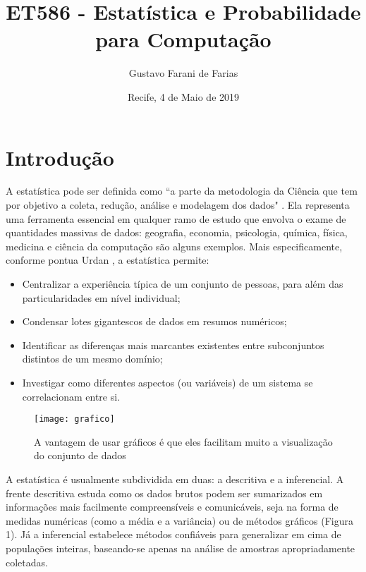 \documentclass[10pt]{article}
\title{ET586 - Estatística e Probabilidade para Computação}
\author{Gustavo Farani de Farias}
\date{Recife, 4 de Maio de 2019}
\begin{document}
\maketitle

\section{Introdução}
A estatística pode ser definida como ``a parte da metodologia da Ciência que tem por objetivo a coleta, redução, análise e modelagem dos dados" \cite{bussab}. Ela representa uma ferramenta essencial em qualquer ramo de estudo que envolva o exame de quantidades massivas de dados: geografia, economia, psicologia, química, física, medicina e ciência da computação são alguns exemplos. Mais especificamente, conforme pontua Urdan \cite{urdan}, a estatística permite:

\begin{itemize}
    \item Centralizar a experiência típica de um conjunto de pessoas, para além das particularidades em nível individual;
    \item Condensar lotes gigantescos de dados em resumos numéricos;
    \item Identificar as diferenças mais marcantes existentes entre subconjuntos distintos de um mesmo domínio;
    \item Investigar como diferentes aspectos (ou variáveis) de um sistema se correlacionam entre si.
\end{itemize}

\begin{SCfigure}[1.5][b]
    \caption{A vantagem de usar gráficos é que eles facilitam muito a visualização do conjunto de dados}
    \cite{grafico}
    \texttt{[image: grafico]}
\end{SCfigure}

A estatística é usualmente subdividida em duas: a descritiva e a inferencial. A frente descritiva estuda como os dados brutos podem ser sumarizados em informações mais facilmente compreensíveis e comunicáveis, seja na forma de medidas numéricas (como a média e a variância) ou de métodos gráficos (Figura 1). Já a inferencial estabelece métodos confiáveis para generalizar em cima de populações inteiras, baseando-se apenas na análise de amostras apropriadamente coletadas.
\end{document}
